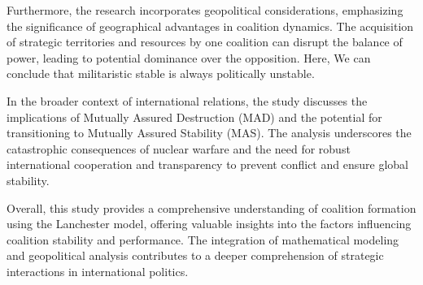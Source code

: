 \documentclass[oneside,12pt]{report}
\begin{document}
Furthermore, the research incorporates geopolitical considerations, emphasizing the significance of geographical advantages in coalition dynamics. The acquisition of strategic territories and resources by one coalition can disrupt the balance of power, leading to potential dominance over the opposition. Here, We can conclude that militaristic stable is always politically unstable.

In the broader context of international relations, the study discusses the implications of Mutually Assured Destruction (MAD) and the potential for transitioning to Mutually Assured Stability (MAS). The analysis underscores the catastrophic consequences of nuclear warfare and the need for robust international cooperation and transparency to prevent conflict and ensure global stability.

Overall, this study provides a comprehensive understanding of coalition formation using the Lanchester model, offering valuable insights into the factors influencing coalition stability and performance. The integration of mathematical modeling and geopolitical analysis contributes to a deeper comprehension of strategic interactions in international politics.



\end{document}
